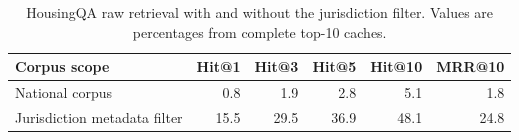 \begin{table}[H]
\centering
\caption{HousingQA raw retrieval with and without the jurisdiction filter. Values are percentages from complete top-10 caches.}
\label{tab:housing_metadata_filter}
\footnotesize
\begin{tabular}{lrrrrr}
\toprule
Corpus scope & Hit@1 & Hit@3 & Hit@5 & Hit@10 & MRR@10 \\
\midrule
National corpus & 0.8 & 1.9 & 2.8 & 5.1 & 1.8 \\
Jurisdiction metadata filter & 15.5 & 29.5 & 36.9 & 48.1 & 24.8 \\
\bottomrule
\end{tabular}
\end{table}
